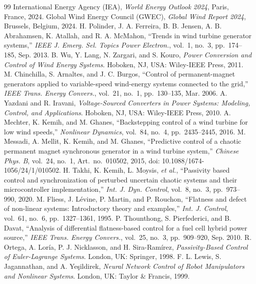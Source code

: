 \documentclass[11pt,a4paper]{article}
\begin{document}
\begin{thebibliography}{99}
 International Energy Agency (IEA), \emph{World Energy Outlook 2024}, Paris, France, 2024.
 Global Wind Energy Council (GWEC), \emph{Global Wind Report 2024}, Brussels, Belgium, 2024.
 H. Polinder, J. A. Ferreira, B. B. Jensen, A. B. Abrahamsen, K. Atallah, and
R. A. McMahon, ``Trends in wind turbine generator systems,'' \emph{IEEE J. Emerg. Sel. Topics Power
Electron.}, vol.~1, no.~3, pp.~174--185, Sep. 2013.
 B. Wu, Y. Lang, N. Zargari, and S. Kouro, \emph{Power Conversion and Control of Wind
Energy Systems}. Hoboken, NJ, USA: Wiley-IEEE Press, 2011.
 M. Chinchilla, S. Arnaltes, and J. C. Burgos, ``Control of permanent-magnet
generators applied to variable-speed wind-energy systems connected to the grid,'' \emph{IEEE Trans.
Energy Convers.}, vol.~21, no.~1, pp.~130--135, Mar. 2006.
 A. Yazdani and R. Iravani, \emph{Voltage-Sourced Converters in Power Systems:
Modeling, Control, and Applications}. Hoboken, NJ, USA: Wiley-IEEE Press, 2010.
 A. Mechter, K. Kemih, and M. Ghanes, ``Backstepping control of a wind turbine for
low wind speeds,'' \emph{Nonlinear Dynamics}, vol.~84, no.~4, pp.~2435--2445, 2016.
 M. Messadi, A. Mellit, K. Kemih, and M. Ghanes, ``Predictive control of a chaotic
permanent magnet synchronous generator in a wind turbine system,'' \emph{Chinese Phys. B}, vol.~24,
no.~1, Art.~no.~010502, 2015, doi: 10.1088/1674-1056/24/1/010502.
 H. Takhi, K. Kemih, L. Moysis, \emph{et al.}, ``Passivity based control and
synchronization of perturbed uncertain chaotic systems and their microcontroller implementation,''
\emph{Int. J. Dyn. Control}, vol.~8, no.~3, pp.~973--990, 2020.
 M. Fliess, J. L\'evine, P. Martin, and P. Rouchon, ``Flatness and defect of
non-linear systems: Introductory theory and examples,'' \emph{Int. J. Control}, vol.~61, no.~6,
pp.~1327--1361, 1995.
 P. Thounthong, S. Pierfederici, and B. Davat, ``Analysis of differential
flatness-based control for a fuel cell hybrid power source,'' \emph{IEEE Trans. Energy Convers.},
vol.~25, no.~3, pp.~909--920, Sep. 2010.
 R. Ortega, A. Lor\'ia, P. J. Nicklasson, and H. Sira-Ram\'irez,
\emph{Passivity-Based Control of Euler-Lagrange Systems}. London, UK: Springer, 1998.
 F. L. Lewis, S. Jagannathan, and A. Ye\c{s}ildirek, \emph{Neural Network Control of
Robot Manipulators and Nonlinear Systems}. London, UK: Taylor \& Francis, 1999.

\end{thebibliography}
\end{document}
